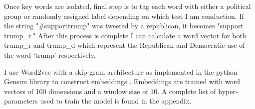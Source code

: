 \documentclass[../embeddings.tex]{subfiles}
\begin{document}
Once key words are isolated, final step is to tag each word with either a political group or randomly assigned label depending on which test I am conduction. If the string "\#supporttrump" was tweeted by a republican, it becomes "support trump\_r." After this process is complete I can calculate a word vector for both trump\_r and trump\_d which represent the Republican and Democratic use of the word ‘trump’ respectively.	

I use Word2vec with a skip-gram architecture as implemented in the python Gensim library to construct embeddings \cite{rehurek_lrec}. Embeddings are trained with word vectors of 100 dimensions and a window size of 10. A complete list of hyper-parameters used to train the model is found in the appendix.
\end{document}
